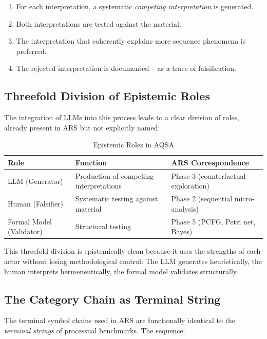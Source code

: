 \documentclass[12pt,a4paper]{article}
\begin{document}
\begin{enumerate}
    \item For each interpretation, a systematic \textit{competing interpretation} is generated.
    \item Both interpretations are tested against the material.
    \item The interpretation that coherently explains more sequence phenomena is preferred.
    \item The rejected interpretation is documented – as a trace of falsification.
\end{enumerate}

\subsection{Threefold Division of Epistemic Roles}

The integration of LLMs into this process leads to a clear division of roles, already present in ARS but not explicitly named:

\begin{table}[H]
\centering
\caption{Epistemic Roles in AQSA}
\label{tab:roles}
\begin{tabular}{@{}lll@{}}
\toprule
Role & Function & ARS Correspondence \\
\midrule
LLM (Generator) & Production of competing interpretations & Phase 3 (counterfactual exploration) \\
Human (Falsifier) & Systematic testing against material & Phase 2 (sequential micro-analysis) \\
Formal Model (Validator) & Structural testing & Phase 5 (PCFG, Petri net, Bayes) \\
\bottomrule
\end{tabular}
\end{table}

This threefold division is epistemically clean because it uses the strengths of each actor without losing methodological control: The LLM generates heuristically, the human interprets hermeneutically, the formal model validates structurally.

\subsection{The Category Chain as Terminal String}

The terminal symbol chains used in ARS are functionally identical to the \textit{terminal strings} of processual benchmarks. The sequence:
\end{document}
